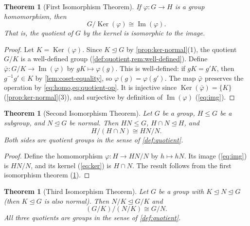 \documentclass[12pt,a4paper]{article}
\theoremstyle{definition}
\theoremstyle{plain}
\newtheorem{theorem}[definition]{Theorem}
\theoremstyle{remark}
\newcommand{\Ker}{\operatorname{Ker}}
\newcommand{\Img}{\operatorname{Im}}
\newcommand{\normal}{\trianglelefteq}
\begin{document}
\begin{theorem}[First Isomorphism Theorem]\label{thm:iso-1}
If $\varphi \colon G \to H$ is a group homomorphism, then
\begin{equation}\label{eq:iso-1}
    G / \Ker(\varphi) \cong \Img(\varphi).
\end{equation}
That is, the quotient of $G$ by the kernel is isomorphic to the image.
\end{theorem}

\begin{proof}
Let $K = \Ker(\varphi)$. Since $K \normal G$ by \cref{prop:ker-normal}(1),
the quotient $G/K$ is a well-defined group (\cref{def:quotient,rem:well-defined}).
Define $\bar{\varphi} \colon G/K \to \Img(\varphi)$ by $gK \mapsto \varphi(g)$.
This is well-defined: if $gK = g'K$, then $g^{-1}g' \in K$ by
\cref{lem:coset-equality}, so $\varphi(g) = \varphi(g')$.
The map $\bar{\varphi}$ preserves the operation by \cref{eq:homo,eq:quotient-op}.
It is injective since $\Ker(\bar{\varphi}) = \{K\}$ (\cref{prop:ker-normal}(3)),
and surjective by definition of $\Img(\varphi)$ (\cref{eq:img}).
\end{proof}

\begin{theorem}[Second Isomorphism Theorem]\label{thm:iso-2}
Let $G$ be a group, $H \leq G$ be a subgroup, and
$N \normal G$ be normal. Then $HN \leq G$, $H \cap N \normal H$, and
\begin{equation}\label{eq:iso-2}
    H / (H \cap N) \cong HN / N.
\end{equation}
Both sides are quotient groups in the sense of \cref{def:quotient}.
\end{theorem}

\begin{proof}
Define the homomorphism $\varphi \colon H \to HN/N$ by
$h \mapsto hN$. Its image (\cref{eq:img}) is $HN/N$, and its kernel (\cref{eq:ker})
is $H \cap N$. The result follows from the first isomorphism theorem (\cref{thm:iso-1}).
\end{proof}

\begin{theorem}[Third Isomorphism Theorem]\label{thm:iso-3}
Let $G$ be a group with $K \normal N \normal G$ (then $K \normal G$ is also normal).
Then $N/K \normal G/K$ and
\begin{equation}\label{eq:iso-3}
    (G/K) / (N/K) \cong G/N.
\end{equation}
All three quotients are groups in the sense of \cref{def:quotient}.
\end{theorem}
\end{document}
